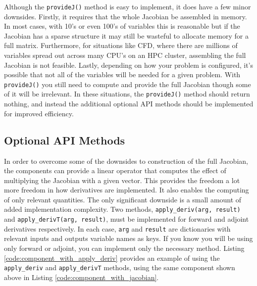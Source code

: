 \documentclass[]{aiaa-tc} %
\begin{document}
        Although the \texttt{provideJ()} method is easy to implement, it does have a few minor downsides. Firstly,
        it requires that the whole Jacobian be assembled in memory. In most cases, with 10's or even 100's of variables
        this is reasonable but if the Jacobian has a sparse structure it may still be wasteful to allocate memory for a
        full matrix. Furthermore, for situations like CFD, where there are millions of variables spread out
        across many CPU's on an HPC cluster, assembling the full Jacobian is not feasible. Lastly, depending on how
        your problem is configured, it's possible that not all of the variables will be needed for a given problem. With
        \texttt{provideJ()} you still need to compute and provide the full Jacobian though some of it will be irrelevant.
        In these situations, the \texttt{provideJ()} method should return nothing, and instead the
        additional optional API methods should be implemented for improved efficiency.

    \subsection{Optional API Methods}

        In order to overcome some of the downsides to construction of the full Jacobian, the components can provide
        a linear operator that computes the effect of multiplying the Jacobian with a given vector. This provides
        the freedom a lot more freedom in how derivatives are implemented. It also enables the computing of only
        relevant quantities. The only significant downside is a small amount of added implementation complexity.
        Two methods, \texttt{apply\_deriv(arg, result)} and \texttt{apply\_derivT(arg, result)}, must be implemented
        for forward and adjoint derivatives respectively. In each case, \texttt{arg} and \texttt{result}
        are dictionaries with relevant inputs and outputs variable names as keys.
        If you know you will be using only forward or adjoint, you can implement only the
        necessary method. Listing \ref{code:component_with_apply_deriv} provides an example of
        using the \texttt{apply\_deriv} and \texttt{apply\_derivT} methods, using the same component shown above in
        Listing \ref{code:component_with_jacobian}.
\end{document}
